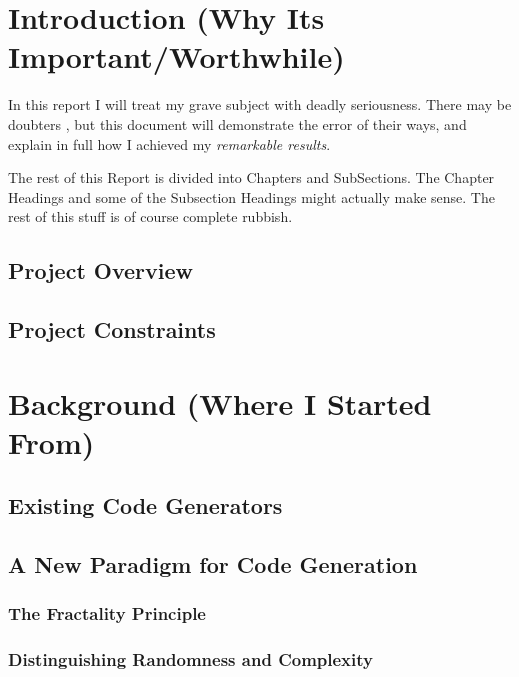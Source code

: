 \documentclass[a4paper,12pt]{mscthesis}
\begin{document}

\widespacing


\chapter{Introduction (Why Its Important/Worthwhile)}

In this report I will treat my grave subject with deadly
seriousness. There may be doubters \cite{wilder:1985},
but this document will demonstrate the error of their ways,
and explain in full how I achieved my {\em remarkable results}.

The rest of this Report is divided into Chapters and SubSections. 
The Chapter Headings and some of the Subsection Headings might
actually make sense. The rest of this stuff is of course 
complete rubbish.

\section{Project Overview}

\section{Project Constraints}

\chapter{Background (Where I Started From)}

\section{Existing Code Generators}

\section{A New Paradigm for Code Generation}

\subsection{The Fractality Principle}

\subsection{Distinguishing Randomness and Complexity}
\end{document}
